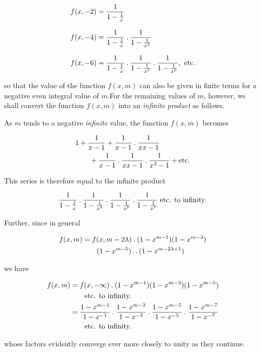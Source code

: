 \[
\begin{aligned}
f(x,-2)&=\frac{1}{1-\frac1x}\\[8pt]
f(x,-4)&=\frac{1}{1-\frac1x}\pdot\frac{1}{1-\frac1{x^3}}\\[8pt]
f(x,-6)&=\frac{1}{1-\frac1x}\pdot\frac{1}{1-\frac1{x^3}}\pdot\frac{1}{1-\frac1{x^5}},\ \text{etc.}
\end{aligned}
\]

so that the value of the function $f(x,m)$ can also be given in finite terms for a negative even integral value of $m$.\quad For the remaining values of $m$, however, we shall convert the function $f(x,m)$ into an \emph{infinite product} as follows.

As $m$ tends to a negative \emph{infinite} value, the function $f(x,m)$ becomes

\[
\begin{aligned}
&1+\frac1{x-1}+\frac1{x-1}\mathbin{.}\frac1{xx-1}\\
&\qquad+\frac1{x-1}\mathbin{.}\frac1{xx-1}\mathbin{.}\frac1{x^3-1}+\text{etc.}
\end{aligned}
\]

This series is therefore equal to the infinite product

\[
\begin{aligned}
\frac1{1-\frac1x}\mathbin{.}\frac1{1-\frac1{x^3}}\mathbin{.}\frac1{1-\frac1{x^5}}\mathbin{.}\frac1{1-\frac1{x^7}}\;\text{etc. to infinity.}
\end{aligned}
\]

Further, since in general

\[
\begin{aligned}
f(x,m)&=f(x,m-2\lambda)\mathbin{.}(1-x^{m-1})(1-x^{m-3})\\
&\qquad(1-x^{m-5})\mathinner{.\,.}(1-x^{m-2\lambda+1})
\end{aligned}
\]

we have

\[
\begin{aligned}
f(x,m)&=f(x,-\infty)\mathbin{.}(1-x^{m-1})(1-x^{m-3})(1-x^{m-5})\\
&\qquad\text{etc. to infinity.}\\
&=\frac{1-x^{m-1}}{1-x^{-1}}\mathbin{.}\frac{1-x^{m-3}}{1-x^{-3}}\mathbin{.}\frac{1-x^{m-5}}{1-x^{-5}}\mathbin{.}\frac{1-x^{m-7}}{1-x^{-7}}\\
&\qquad\text{etc. to infinity.}
\end{aligned}
\]

whose factors evidently converge ever more closely to unity as they continue.

